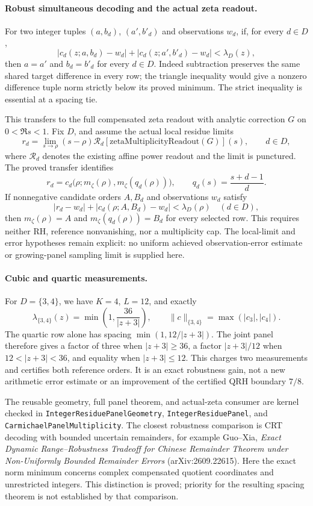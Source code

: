 \paragraph{Robust simultaneous decoding and the actual zeta readout.}
For two integer tuples \((a,b_d)\), \((a',b'_d)\) and observations \(w_d\),
if, for every \(d\in D\),
\[
 |c_d(z;a,b_d)-w_d|+|c_d(z;a',b'_d)-w_d|<\lambda_D(z),
\]
then \(a=a'\) and \(b_d=b'_d\) for every \(d\in D\).
Indeed subtraction preserves the same shared target difference in every row;
the triangle inequality would give a nonzero difference tuple norm strictly
below its proved minimum. The strict inequality is essential at a spacing tie.

This transfers to the full compensated zeta readout with analytic correction
\(G\) on \(0<\Re s<1\). Fix \(D\), and assume the actual local residue limits
\[
 r_d=\lim_{s\to\rho}(s-\rho)
   \mathcal R_d[\mathrm{zetaMultiplicityReadout}(G)](s),\qquad d\in D,
\]
where \(\mathcal R_d\) denotes the existing affine power readout and the
limit is punctured. The proved transfer identifies
\[
 r_d=c_d\bigl(\rho;m_\zeta(\rho),m_\zeta(q_d(\rho))\bigr),\qquad
 q_d(s)=\frac{s+d-1}{d}.
\]
If nonnegative candidate orders \(A,B_d\) and observations \(w_d\) satisfy
\[
 |r_d-w_d|+|c_d(\rho;A,B_d)-w_d|<\lambda_D(\rho)
 \quad(d\in D),
\]
then \(m_\zeta(\rho)=A\) and \(m_\zeta(q_d(\rho))=B_d\) for every selected row.
This requires neither RH, reference nonvanishing, nor a multiplicity cap.
The local-limit and error hypotheses remain explicit: no uniform achieved
observation-error estimate or growing-panel sampling limit is supplied here.

\paragraph{Cubic and quartic measurements.}
For \(D=\{3,4\}\), we have \(K=4\), \(L=12\), and exactly
\[
 \lambda_{\{3,4\}}(z)=\min\left(1,\frac{36}{|z+3|}\right),\qquad
 \|c\|_{\{3,4\}}=\max(|c_3|,|c_4|).
\]
The quartic row alone has spacing \(\min(1,12/|z+3|)\).
The joint panel therefore gives a factor of three when \(|z+3|\ge36\),
a factor \(|z+3|/12\) when \(12<|z+3|<36\), and equality when
\(|z+3|\le12\). This charges two measurements and certifies both reference
orders. It is an exact robustness gain, not a new arithmetic error estimate
or an improvement of the certified QRH boundary \(7/8\).

The reusable geometry, full panel theorem, and actual-zeta consumer are
kernel checked in \texttt{IntegerResiduePanelGeometry},
\texttt{IntegerResiduePanel}, and \texttt{CarmichaelPanelMultiplicity}.
The closest robustness comparison is CRT decoding with bounded uncertain
remainders, for example Guo--Xia, \emph{Exact Dynamic Range--Robustness Tradeoff
for Chinese Remainder Theorem under Non-Uniformly Bounded Remainder Errors}
(arXiv:2609.22615). Here the exact norm minimum concerns complex compensated
quotient coordinates and unrestricted integers. This distinction is proved;
priority for the resulting spacing theorem is not established by that comparison.

